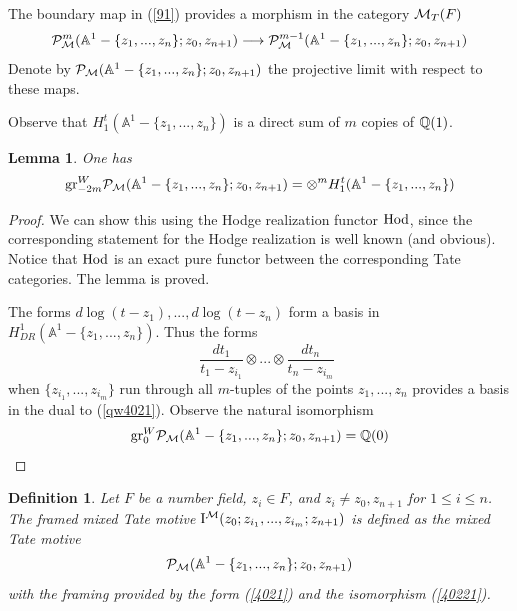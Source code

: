 \documentclass[10pt]{article}
\newtheorem{lemma}[theorem]{Lemma}
\newtheorem{definition}[theorem]{Definition}
\begin{document}
The boundary map in   (\ref{91}) provides a morphism  
in the category ${\cal M}_T(F)$
$$
{\cal P}^{m}_{\cal M}({\mathbb A}^1 - \{z_1, ..., z_n\}; z_0, z_{n+1}) \longrightarrow 
{\cal P}^{m-1}_{\cal M}({\mathbb A}^1 - \{z_1, ..., z_n\}; z_0, z_{n+1})
$$
Denote by ${\cal P}_{\cal M}({\mathbb A}^1 - \{z_1, ..., z_n\}; z_0, z_{n+1})$ the projective limit 
with respect to these maps. 

 Observe that $H^t_1({\mathbb A}^1 - \{z_1, ..., z_n\})$ is a direct sum of $m$ copies of 
${\mathbb Q}(1)$. 

\begin{lemma} \label{1012}
One has 
\begin{equation} \label{qw4021}
{\rm gr}^W_{-2m}{\cal P}_{\cal M}({\mathbb A}^1 - \{z_1, ..., z_n\}; z_0, z_{n+1}) = 
\otimes^mH^t_1({\mathbb A}^1 - \{z_1, ..., z_n\})
\end{equation}
\end{lemma}

\begin{proof} We can show this using the Hodge realization functor ${\rm Hod}$, 
since the corresponding statement for the Hodge realization is well known (and obvious). 
Notice that ${\rm Hod}$ is an exact pure functor between 
the corresponding Tate categories.  
The lemma is proved. 


The forms $d\log (t-z_{1}), ..., d\log (t-z_{n})$ 
form a basis in $H_{DR}^1({\mathbb A}^1 - \{z_1, ..., z_n\})$. 
  Thus the forms 
\begin{equation} \label{4021}
 \quad \frac{dt_1}{t_1-z_{i_1}} \otimes  ... \otimes \frac{dt_n}{t_n-z_{i_m}} 
\end{equation}
when $\{z_{i_1}, ..., z_{i_m}\}$  run through all $m$-tuples of the points 
$z_1, ..., z_{n}$ 
  provides a basis in the dual to (\ref{qw4021}). Observe the natural  isomorphism
\begin{equation} \label{40221}
{\rm gr}^W_{0}{\cal P}_{\cal M}({\mathbb A}^1 - \{z_1, ..., z_n\}; z_0, z_{n+1}) = 
{\mathbb Q}(0)
\end{equation}


\end{proof}

\begin{definition} \label{16.2.01.1} Let $F$ be a number field, $z_i \in F$, and 
$z_i \not = z_0, z_{n+1}$ for $1 \leq i \leq n$. 
The framed mixed Tate motive ${\rm I}^{\cal M}(z_0; z_{i_1}, ... , z_{i_m}; z_{n+1})$ 
is defined as the mixed Tate motive 
$$
{\cal P}_{\cal M}({\mathbb A}^1 - \{z_1, ..., z_n\}; z_0, z_{n+1})
$$
 with the framing provided  by 
the form (\ref{4021}) and the isomorphism (\ref{40221}). 
\end{definition}
\end{document}
